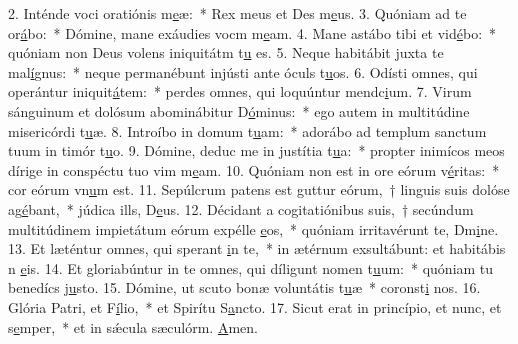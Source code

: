2. Inténde voci oratiónis m\uline{e}æ:~* Rex meus et Des m\uline{e}us.
3. Quóniam ad te or\uline{á}bo:~* Dómine, mane exáudies vocm m\uline{e}am.
4. Mane astábo tibi et vid\uline{é}bo:~* quóniam non Deus volens iniquitátm t\uline{u} es.
5. Neque habitábit juxta te mal\uline{í}gnus:~* neque permanébunt injústi ante óculs t\uline{u}os.
6. Odísti omnes, qui operántur iniquit\uline{á}tem:~* perdes omnes, qui loquúntur mendc\uline{i}um.
7. Virum sánguinum et dolósum abominábitur D\uline{ó}minus:~* ego autem in multitúdine misericórdi t\uline{u}æ.
8. Introíbo in domum t\uline{u}am:~* adorábo ad templum sanctum tuum in timór t\uline{u}o.
9. Dómine, deduc me in justítia t\uline{u}a:~* propter inimícos meos dírige in conspéctu tuo vim m\uline{e}am.
10. Quóniam non est in ore eórum v\uline{é}ritas:~* cor eórum vn\uline{u}m est.
11. Sepúlcrum patens est guttur eórum,~† linguis suis dolóse ag\uline{é}bant,~* júdica ills, D\uline{e}us.
12. Décidant a cogitatiónibus suis,~† secúndum multitúdinem impietátum eórum expélle \uline{e}os,~* quóniam irritavérunt te, Dm\uline{i}ne.
13. Et læténtur omnes, qui sperant \uline{i}n te,~* in ætérnum exsultábunt: et habitábis n \uline{e}is.
14. Et gloriabúntur in te omnes, qui díligunt nomen t\uline{u}um:~* quóniam tu benedícs j\uline{u}sto.
15. Dómine, ut scuto bonæ voluntátis t\uline{u}æ~* coronst\uline{i} nos.
16. Glória Patri, et F\uline{í}lio,~* et Spirítu S\uline{a}ncto.
17. Sicut erat in princípio, et nunc, et s\uline{e}mper,~* et in sǽcula sæculórm. \uline{A}men.
